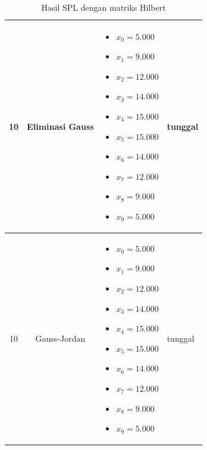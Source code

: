 \documentclass[12pt,a4paper]{report}
\begin{document}
\begin{table}[H]
    \centering
    \caption{Hasil SPL dengan matriks Hilbert}
    \begin{tabular}{|c|c|p{5cm}|l|}
        \hline
        10 & Eliminasi Gauss & 
        \begin{itemize}
            \item $x_0 = 5.000$
            \item $x_1 = 9.000$
            \item $x_2 = 12.000$
            \item $x_3 = 14.000$
            \item $x_4 = 15.000$
            \item $x_5 = 15.000$
            \item $x_6 = 14.000$
            \item $x_7 = 12.000$
            \item $x_8 = 9.000$
            \item $x_9 = 5.000$
        \end{itemize}
        & tunggal\\
        \hline
        10 & Gauss-Jordan & 
        \begin{itemize}
            \item $x_0 = 5.000$
            \item $x_1 = 9.000$
            \item $x_2 = 12.000$
            \item $x_3 = 14.000$
            \item $x_4 = 15.000$
            \item $x_5 = 15.000$
            \item $x_6 = 14.000$
            \item $x_7 = 12.000$
            \item $x_8 = 9.000$
            \item $x_9 = 5.000$
        \end{itemize}
        & tunggal\\
        \hline
        \end{tabular}
\end{table}
\end{document}
